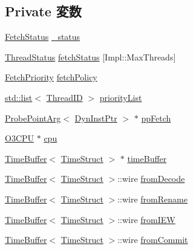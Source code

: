\subsection*{Private 変数}
\begin{DoxyCompactItemize}
\item 
\hyperlink{classDefaultFetch_a64605db3d589dcf77a170612ff89515e}{FetchStatus} \hyperlink{classDefaultFetch_aa3fc43283eb7a93d6a41830bbd412681}{\_\-status}
\item 
\hyperlink{classDefaultFetch_ae2739961013a00cede621d4d72f2173c}{ThreadStatus} \hyperlink{classDefaultFetch_a852cb41bf6074487410b49ec9ff53c00}{fetchStatus} \mbox{[}Impl::MaxThreads\mbox{]}
\item 
\hyperlink{classDefaultFetch_a818d5f50fdcec74a1a445b4fa8b760e3}{FetchPriority} \hyperlink{classDefaultFetch_aad8c2ca9262308cfdb74cd69cda508f6}{fetchPolicy}
\item 
\hyperlink{classstd_1_1list}{std::list}$<$ \hyperlink{base_2types_8hh_ab39b1a4f9dad884694c7a74ed69e6a6b}{ThreadID} $>$ \hyperlink{classDefaultFetch_a0d967261cbbce522509d85936b8ce786}{priorityList}
\item 
\hyperlink{classProbePointArg}{ProbePointArg}$<$ \hyperlink{classDefaultFetch_a028ce10889c5f6450239d9e9a7347976}{DynInstPtr} $>$ $\ast$ \hyperlink{classDefaultFetch_a853ac5048dfdbba414f6f8186dd11afd}{ppFetch}
\item 
\hyperlink{classDefaultFetch_a44622cf06940413482836cb62931ac3f}{O3CPU} $\ast$ \hyperlink{classDefaultFetch_a1379cf882a12ac6fc9eba5da7c84b18b}{cpu}
\item 
\hyperlink{classTimeBuffer}{TimeBuffer}$<$ \hyperlink{structTimeStruct}{TimeStruct} $>$ $\ast$ \hyperlink{classDefaultFetch_a83f9ee976e732665aeb08dbc19acfd45}{timeBuffer}
\item 
\hyperlink{classTimeBuffer}{TimeBuffer}$<$ \hyperlink{structTimeStruct}{TimeStruct} $>$::wire \hyperlink{classDefaultFetch_a1116d028078c70aa1579726747303a55}{fromDecode}
\item 
\hyperlink{classTimeBuffer}{TimeBuffer}$<$ \hyperlink{structTimeStruct}{TimeStruct} $>$::wire \hyperlink{classDefaultFetch_ae99c54a9c8f1e218b86afcee348c54fc}{fromRename}
\item 
\hyperlink{classTimeBuffer}{TimeBuffer}$<$ \hyperlink{structTimeStruct}{TimeStruct} $>$::wire \hyperlink{classDefaultFetch_a6c9093e88770a58dc8853f49a09bbac8}{fromIEW}
\item 
\hyperlink{classTimeBuffer}{TimeBuffer}$<$ \hyperlink{structTimeStruct}{TimeStruct} $>$::wire \hyperlink{classDefaultFetch_a0055a92bd94eda21c2641d46ff013dac}{fromCommit}

\end{DoxyCompactItemize}
